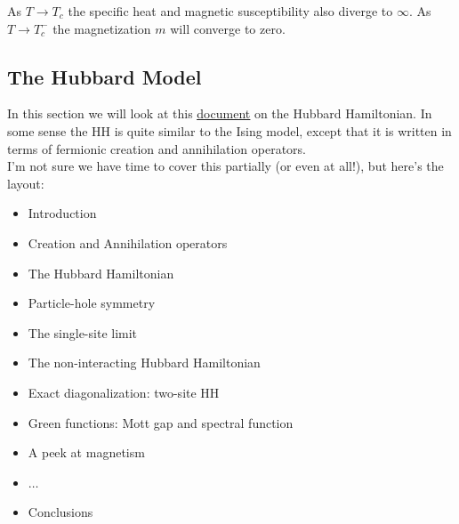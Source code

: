 \documentclass{book}
\theoremstyle{definition}
\begin{document}
As $T\to T_c$ the specific heat  and magnetic susceptibility also diverge to $\infty$. As $T\to T_c^-$ the magnetization $m$ will converge to zero. 





































\subsection{The Hubbard Model}

In this section we will look at this \href{https://www.cond-mat.de/events/correl16/manuscripts/scalettar.pdf}{\underline{document}} on the Hubbard Hamiltonian. In some sense the HH is quite similar to the Ising model, except that it is written in terms of fermionic creation and annihilation operators. \\

I'm not sure we have time to cover this partially (or even at all!), but here's the layout: 
\begin{itemize}
	\item Introduction
	\item Creation and Annihilation operators
	\item The Hubbard Hamiltonian
	\item Particle-hole symmetry
	\item The single-site limit
	\item The non-interacting Hubbard Hamiltonian
	\item Exact diagonalization: two-site HH
	\item Green functions: Mott gap and spectral function
	\item A peek at magnetism
	\item $\dots$
	\item Conclusions
\end{itemize}
\end{document}
